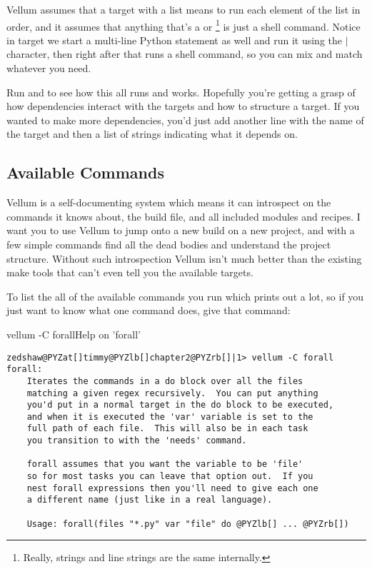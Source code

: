 Vellum assumes that a target with a list means to run each element of the list
in order, and it assumes that anything that's a  or \footnote{Really, strings and line strings are the same internally.}
is just a shell command.  Notice in target  we start a
multi-line Python statement as well and run it using the $|$ character, then
right after that runs a shell command, so you can mix and match whatever you
need.

Run  and  to see how this all runs and works.
Hopefully you're getting a grasp of how dependencies interact with the targets
and how to structure a target.  If you wanted to make more dependencies, you'd
just add another line with the name of the target and then a list of strings
indicating what it depends on.



\subsection{Available Commands}

Vellum is a self-documenting system which means it can introspect on the
commands it knows about, the build file, and all included modules and recipes.
I want you to use Vellum to jump onto a new build on a new
project, and with a few simple commands find all the dead bodies and understand
the project structure.  Without such introspection Vellum isn't much better than
the existing make tools that can't even tell you the available targets.

To list the all of the available commands you run  which prints
out a lot, so if you just want to know what one command does, give that command:

\begin{code}{vellum -C forall}{Help on 'forall'}
\begin{Verbatim}[commandchars=@\[\]]
zedshaw@PYZat[]timmy@PYZlb[]chapter2@PYZrb[]|1> vellum -C forall
forall:
    Iterates the commands in a do block over all the files
    matching a given regex recursively.  You can put anything
    you'd put in a normal target in the do block to be executed,
    and when it is executed the 'var' variable is set to the
    full path of each file.  This will also be in each task
    you transition to with the 'needs' command.

    forall assumes that you want the variable to be 'file'
    so for most tasks you can leave that option out.  If you
    nest forall expressions then you'll need to give each one
    a different name (just like in a real language).

    Usage: forall(files "*.py" var "file" do @PYZlb[] ... @PYZrb[])
\end{Verbatim}

\end{code}



